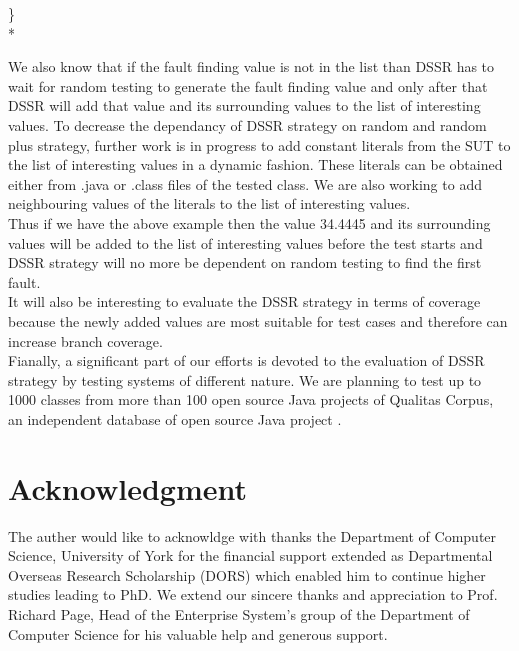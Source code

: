 \documentclass[10pt, conference, compsocconf]{IEEEtran}
\begin{document}
\} \\*


We also know that if the fault finding value is not in the list than DSSR has to wait for random testing to generate the fault finding value and only after that DSSR will add that value and its surrounding values to the list of interesting values. To decrease the dependancy of DSSR strategy on random and random plus strategy, further work is in progress to add constant literals from the SUT to the list of interesting values in a dynamic fashion. These literals can be obtained either from .java or .class files of the tested class. We are also working to add  neighbouring values of the literals to the list of interesting values. \\

Thus if we have the above example then the value 34.4445 and its surrounding values will be added to the list of interesting values before the test starts and DSSR strategy will no more be dependent on random testing to find the first fault.\\

It will also be interesting to evaluate the DSSR strategy in terms of coverage because the newly added values are most suitable for test cases and therefore can increase branch coverage. \\

Fianally, a significant part of our efforts is devoted to the evaluation of DSSR strategy by testing systems of different nature. We are planning to test up to 1000 classes from more than 100 open source Java projects of Qualitas Corpus, an independent database of open source Java project \cite{Tempero2010}. \\



\section*{Acknowledgment}
The auther would like to acknowldge with thanks the Department of Computer Science, University of York for the financial support extended as Departmental Overseas Research Scholarship (DORS) which enabled him to continue higher studies leading to PhD. We extend our sincere thanks and appreciation to Prof. Richard Page, Head of the Enterprise System's group of the Department of Computer Science for his valuable help and generous support.\\







%
%
%

\end{document}
